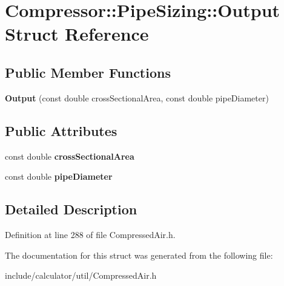 \hypertarget{struct_compressor_1_1_pipe_sizing_1_1_output}{}\section{Compressor\+:\+:Pipe\+Sizing\+:\+:Output Struct Reference}
\label{struct_compressor_1_1_pipe_sizing_1_1_output}
\subsection*{Public Member Functions}
\begin{DoxyCompactItemize}
\item 
\mbox{\label{struct_compressor_1_1_pipe_sizing_1_1_output_a30c100e28cf3648c7d0295e6e534dfad}} 
{\bfseries Output} (const double cross\+Sectional\+Area, const double pipe\+Diameter)
\end{DoxyCompactItemize}
\subsection*{Public Attributes}
\begin{DoxyCompactItemize}
\item 
\mbox{\label{struct_compressor_1_1_pipe_sizing_1_1_output_ad609e5f5deba43dfb986ece30d93aa27}} 
const double {\bfseries cross\+Sectional\+Area}
\item 
\mbox{\label{struct_compressor_1_1_pipe_sizing_1_1_output_ab3a3dcae4259383d06f563a39e617559}} 
const double {\bfseries pipe\+Diameter}
\end{DoxyCompactItemize}


\subsection{Detailed Description}


Definition at line 288 of file Compressed\+Air.\+h.



The documentation for this struct was generated from the following file\+:\begin{DoxyCompactItemize}
\item 
include/calculator/util/Compressed\+Air.\+h\end{DoxyCompactItemize}
